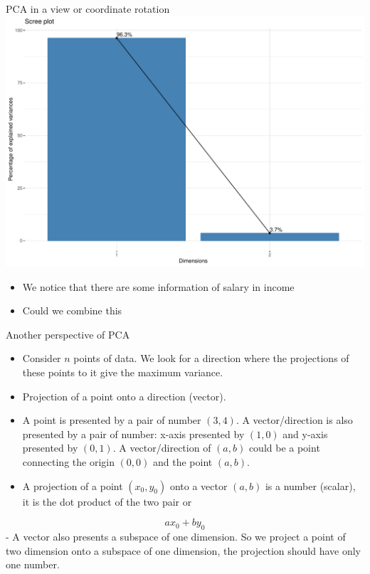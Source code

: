 \documentclass[
  ignorenonframetext,
]{beamer}
\providecommand{\tightlist}{%
  \setlength{\itemsep}{0pt}\setlength{\parskip}{0pt}}\usepackage{longtable,booktabs,array}
\begin{document}
\begin{frame}[fragile]{PCA in a view or coordinate rotation}
\includegraphics{note9_files/figure-beamer/unnamed-chunk-3-1.pdf}

\begin{itemize}
\tightlist
\item
  We notice that there are some information of salary in income
\item
  Could we combine this
\end{itemize}
\end{frame}

\begin{frame}{Another perspective of PCA}
\protect\hypertarget{another-perspective-of-pca}{}
\begin{itemize}
\item
  Consider \(n\) points of data. We look for a direction where the
  projections of these points to it give the maximum variance.
\item
  Projection of a point onto a direction (vector).
\item
  A point is presented by a pair of number \((3,4)\). A vector/direction
  is also presented by a pair of number: x-axis presented by \((1,0)\)
  and y-axis presented by \((0,1)\). A vector/direction of \((a,b)\)
  could be a point connecting the origin \((0,0)\) and the point
  \((a,b)\).
\item
  A projection of a point \((x_0, y_0)\) onto a vector \((a,b)\) is a
  number (scalar), it is the dot product of the two pair or
\end{itemize}

\[
ax_0 + by_0
\] - A vector also presents a subspace of one dimension. So we project a
point of two dimension onto a subspace of one dimension, the projection
should have only one number.
\end{frame}
\end{document}
